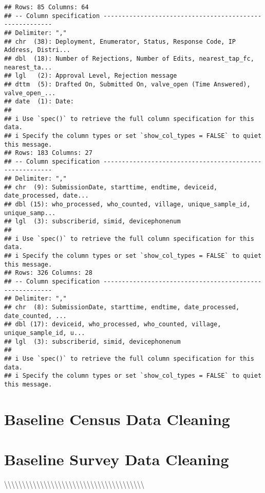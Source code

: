 \documentclass[
]{article}
\begin{document}
\begin{verbatim}
## Rows: 85 Columns: 64
## -- Column specification --------------------------------------------------------
## Delimiter: ","
## chr  (38): Deployment, Enumerator, Status, Response Code, IP Address, Distri...
## dbl  (18): Number of Rejections, Number of Edits, nearest_tap_fc, nearest_ta...
## lgl   (2): Approval Level, Rejection message
## dttm  (5): Drafted On, Submitted On, valve_open (Time Answered), valve_open_...
## date  (1): Date:
## 
## i Use `spec()` to retrieve the full column specification for this data.
## i Specify the column types or set `show_col_types = FALSE` to quiet this message.
## Rows: 183 Columns: 27
## -- Column specification --------------------------------------------------------
## Delimiter: ","
## chr  (9): SubmissionDate, starttime, endtime, deviceid, date_processed, date...
## dbl (15): who_processed, who_counted, village, unique_sample_id, unique_samp...
## lgl  (3): subscriberid, simid, devicephonenum
## 
## i Use `spec()` to retrieve the full column specification for this data.
## i Specify the column types or set `show_col_types = FALSE` to quiet this message.
## Rows: 326 Columns: 28
## -- Column specification --------------------------------------------------------
## Delimiter: ","
## chr  (8): SubmissionDate, starttime, endtime, date_processed, date_counted, ...
## dbl (17): deviceid, who_processed, who_counted, village, unique_sample_id, u...
## lgl  (3): subscriberid, simid, devicephonenum
## 
## i Use `spec()` to retrieve the full column specification for this data.
## i Specify the column types or set `show_col_types = FALSE` to quiet this message.
\end{verbatim}

\newpage

\hypertarget{baseline-census-data-cleaning}{%
\section{Baseline Census Data
Cleaning}\label{baseline-census-data-cleaning}}

\newpage

\hypertarget{baseline-survey-data-cleaning}{%
\section{Baseline Survey Data
Cleaning}\label{baseline-survey-data-cleaning}}

\textbackslash\textbackslash\textbackslash\textbackslash\textbackslash\textbackslash\textbackslash\textbackslash\textbackslash\textbackslash\textbackslash\textbackslash\textbackslash\textbackslash\textbackslash\textbackslash\textbackslash\textbackslash\textbackslash\textbackslash\textbackslash\textbackslash\textbackslash\textbackslash\textbackslash\textbackslash\textbackslash\textbackslash\textbackslash\textbackslash\textbackslash\textbackslash\textbackslash\textbackslash\textbackslash\textbackslash\textbackslash\textbackslash\textbackslash{}
\end{document}
